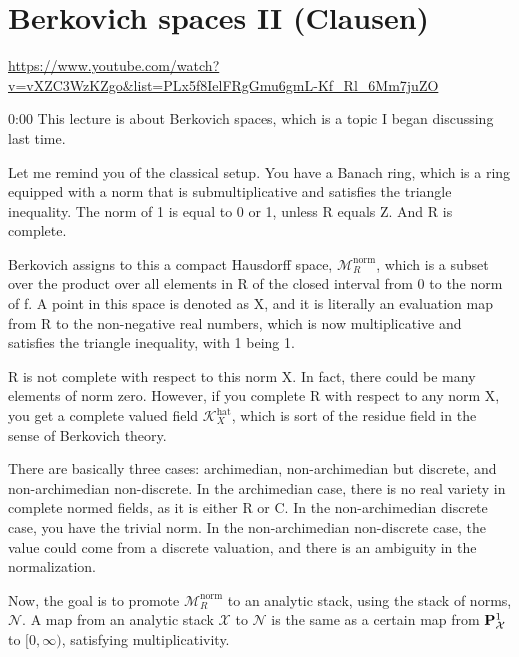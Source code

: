 
\section{\ufs Berkovich spaces II (Clausen)}

\url{https://www.youtube.com/watch?v=vXZC3WzKZgo&list=PLx5f8IelFRgGmu6gmL-Kf_Rl_6Mm7juZO}
\renewcommand{\yt}[2]{\href{https://www.youtube.com/watch?v=vXZC3WzKZgo&list=PLx5f8IelFRgGmu6gmL-Kf_Rl_6Mm7juZO&t=#1}{#2}}
\vspace{1em}

\begin{unfinished}{0:00}
This lecture is about Berkovich spaces, which is a topic I began discussing last time.

Let me remind you of the classical setup. You have a Banach ring, which is a ring equipped with a norm that is submultiplicative and satisfies the triangle inequality. The norm of 1 is equal to 0 or 1, unless R equals Z. And R is complete.

Berkovich assigns to this a compact Hausdorff space, $\mathcal{M}_R^{\text{norm}}$, which is a subset over the product over all elements in R of the closed interval from 0 to the norm of f. A point in this space is denoted as X, and it is literally an evaluation map from R to the non-negative real numbers, which is now multiplicative and satisfies the triangle inequality, with 1 being 1.

R is not complete with respect to this norm X. In fact, there could be many elements of norm zero. However, if you complete R with respect to any norm X, you get a complete valued field $\mathcal{K}_X^{\text{hat}}$, which is sort of the residue field in the sense of Berkovich theory.

There are basically three cases: archimedian, non-archimedian but discrete, and non-archimedian non-discrete. In the archimedian case, there is no real variety in complete normed fields, as it is either R or C. In the non-archimedian discrete case, you have the trivial norm. In the non-archimedian non-discrete case, the value could come from a discrete valuation, and there is an ambiguity in the normalization.

Now, the goal is to promote $\mathcal{M}_R^{\text{norm}}$ to an analytic stack, using the stack of norms, $\mathcal{N}$. A map from an analytic stack $\mathcal{X}$ to $\mathcal{N}$ is the same as a certain map from $\P^1_{\mathcal{X}}$ to $[0, \infty)$, satisfying multiplicativity.


\end{unfinished}
